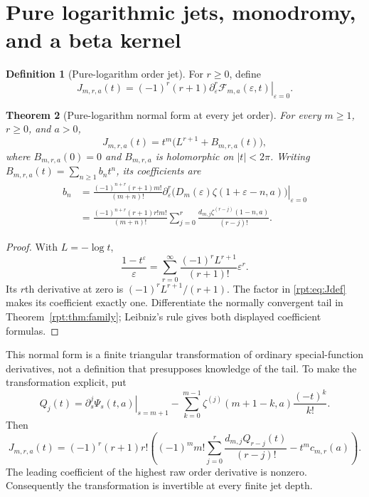 \documentclass[11pt,a4paper]{article}
\numberwithin{equation}{section}
\newtheorem{theorem}{Theorem}[section]
\theoremstyle{definition}\newtheorem{definition}[theorem]{Definition}
\theoremstyle{remark}\newtheorem{remark}[theorem]{Remark}
\newcommand{\eps}{\varepsilon}
\newcommand{\calF}{\mathscr F}
\begin{document}
\section{Pure logarithmic jets, monodromy, and a beta kernel}
\label{rpt:sec:jets}

\begin{definition}[Pure-logarithm order jet]
For $r\ge0$, define
\begin{equation}
J_{m,r,a}(t)=(-1)^r(r+1)
\left.\partial_\eps^r\calF_{m,a}(\eps,t)\right|_{\eps=0}.
\label{rpt:eq:Jdef}
\end{equation}
\end{definition}

\begin{theorem}[Pure-logarithm normal form at every jet order]
\label{rpt:thm:jets}
For every $m\ge1$, $r\ge0$, and $a>0$,
\begin{equation}
\boxed{\quad J_{m,r,a}(t)=t^m\bigl(L^{r+1}+B_{m,r,a}(t)\bigr),\quad}
\label{rpt:eq:Jnormal}
\end{equation}
where $B_{m,r,a}(0)=0$ and $B_{m,r,a}$ is holomorphic on $|t|<2\pi$. Writing $B_{m,r,a}(t)=\sum_{n\ge1}b_n t^n$, its coefficients are
\begin{align}
b_n
&=\frac{(-1)^{n+r}(r+1)m!}{(m+n)!}
\left.\partial_\eps^r
 \bigl(D_m(\eps)\zeta(1+\eps-n,a)\bigr)\right|_{\eps=0}
\label{rpt:eq:bder}\\
&=\frac{(-1)^{n+r}(r+1)r!m!}{(m+n)!}
\sum_{j=0}^r\frac{d_{m,j}\zeta^{(r-j)}(1-n,a)}{(r-j)!}.
\label{rpt:eq:bfinite}
\end{align}
\end{theorem}
\begin{proof}
With $L=-\log t$,
\[
\frac{1-t^\eps}{\eps}
=\sum_{r=0}^{\infty}\frac{(-1)^rL^{r+1}}{(r+1)!}\eps^r.
\]
Its $r$th derivative at zero is $(-1)^rL^{r+1}/(r+1)$. The factor in \eqref{rpt:eq:Jdef} makes its coefficient exactly one. Differentiate the normally convergent tail in Theorem~\ref{rpt:thm:family}; Leibniz's rule gives both displayed coefficient formulas.
\end{proof}

This normal form is a finite triangular transformation of ordinary special-function derivatives, not a definition that presupposes knowledge of the tail. To make the transformation explicit, put
\[
Q_j(t)=\left.\partial_s^j\Psi_s(t,a)\right|_{s=m+1}
 -\sum_{k=0}^{m-1}\zeta^{(j)}(m+1-k,a)\frac{(-t)^k}{k!}.
\]
Then
\begin{equation}
J_{m,r,a}(t)=(-1)^r(r+1)r!
\left((-1)^m m!\sum_{j=0}^r\frac{d_{m,j}Q_{r-j}(t)}{(r-j)!}
-t^m c_{m,r}(a)\right).
\label{rpt:eq:triangular}
\end{equation}
The leading coefficient of the highest raw order derivative is nonzero. Consequently the transformation is invertible at every finite jet depth.
\end{document}
